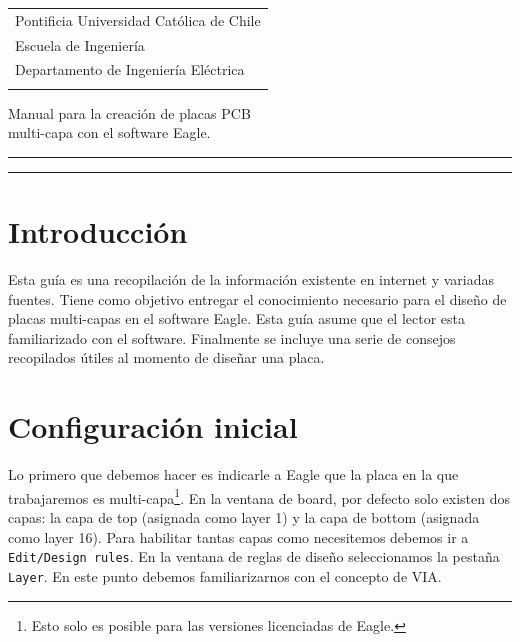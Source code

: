 \documentclass[11pt,letterpaper,spanish]{article}
\begin{document}
\renewcommand{\tablename}{Tabla}

    \begin{tabular}{l}%
    Pontificia Universidad Cat\'olica de Chile\\
    Escuela de Ingenier\'ia\\
    Departamento de Ingenier\'ia El\'ectrica\\
  \vspace{1.9 cm}\mbox{}
    \end{tabular}
    \bigskip
 
\begin{center}
\huge{Manual para la creación de placas PCB\\ multi-capa con el software Eagle.}\\
\vspace{0.5 cm}
\hrule
\vspace{0.1 cm}
\hrule
\end{center}
\vspace{0.2 cm}
\section{Introducción}
\par 
 Esta guía es una recopilación de la información existente en internet y variadas fuentes. Tiene como objetivo entregar el conocimiento necesario para el diseño de placas multi-capas en el software Eagle.  Esta guía asume que el lector esta familiarizado con el software. Finalmente se incluye una serie de consejos recopilados útiles al momento de diseñar una placa.
\section{Configuración inicial}
Lo primero que debemos hacer es indicarle a Eagle que la placa en la que trabajaremos es multi-capa\footnote{Esto solo es posible para las versiones licenciadas de Eagle.}. En la ventana de board, por defecto solo existen dos capas: la capa de top (asignada como layer 1) y la capa de bottom (asignada como layer 16). Para habilitar tantas capas como necesitemos debemos ir a \verb+Edit/Design rules+. En la ventana de reglas de diseño seleccionamos la pestaña \verb+Layer+. En este punto debemos familiarizarnos con el concepto de VIA.
\end{document}

